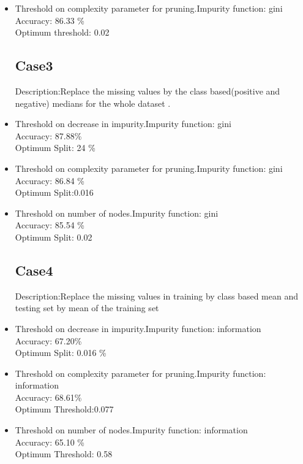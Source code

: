 \documentclass[a4paper]{article}
\begin{document}
\begin{itemize}
\item Threshold on complexity parameter for pruning.Impurity function: gini\\
Accuracy: 86.33 \%  \\
Optimum threshold: 0.02


\subsection{Case3}
Description:Replace the missing values by the class based(positive and negative) medians for the whole dataset .


\item Threshold on decrease in impurity.Impurity function: gini\\
Accuracy: 87.88\%  \\
Optimum Split: 24 \%

\item Threshold on complexity parameter for pruning.Impurity function: gini\\
Accuracy: 86.84 \%  \\
Optimum Split:0.016

\item Threshold on number of nodes.Impurity function: gini\\
Accuracy: 85.54 \%  \\
Optimum Split: 0.02


\subsection{Case4}
Description:Replace the missing values in training by class based mean and testing set by mean of the training set


\item Threshold on decrease in impurity.Impurity function: information\\
Accuracy: 67.20\%  \\
Optimum Split: 0.016 \%

\item Threshold on complexity parameter for pruning.Impurity function: information\\
Accuracy: 68.61\%  \\
Optimum Threshold:0.077

\item Threshold on number of nodes.Impurity function: information\\
Accuracy: 65.10  \%  \\
Optimum Threshold: 0.58




\end{itemize} 
\end{document}
